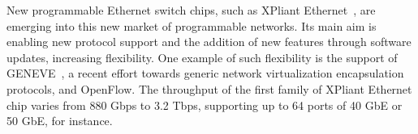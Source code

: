 {New programmable Ethernet switch chips, such as XPliant Ethernet~\cite{McGillicuddy2014_4}, are emerging into this new market of programmable networks.
Its main aim is enabling new protocol support and the addition of new features through software updates, increasing flexibility.
One example of such flexibility is the support of GENEVE~\cite{Gross2014_4}, a recent effort towards generic network virtualization encapsulation protocols, and OpenFlow.
The throughput of the first family of XPliant Ethernet chip varies from 880 Gbps to 3.2 Tbps, supporting up to 64 ports of 40 GbE or 50 GbE, for instance. 
}



